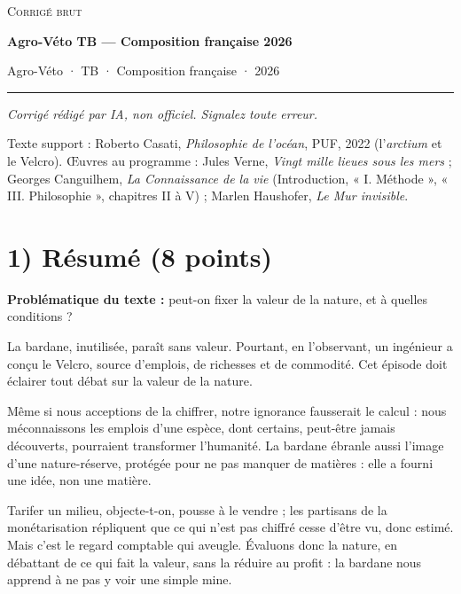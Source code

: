\documentclass[11pt,a4paper]{article}
\begin{document}
\thispagestyle{plain}
\begin{center}
  {\small\scshape Corrigé brut}\par\smallskip
  {\LARGE\bfseries Agro-Véto TB — Composition française 2026\par}\medskip
  {\large Agro-Véto · TB · Composition française · 2026\par}
\end{center}
\vspace{2pt}\hrule\vspace{8pt}

\emph{Corrigé rédigé par IA, non officiel. Signalez toute erreur.}

Texte support : Roberto Casati, \emph{Philosophie de l'océan}, PUF, 2022 (l'\emph{arctium} et le Velcro). Œuvres au programme : Jules Verne, \emph{Vingt mille lieues sous les mers} ; Georges Canguilhem, \emph{La Connaissance de la vie} (Introduction, « I. Méthode », « III. Philosophie », chapitres II à V) ; Marlen Haushofer, \emph{Le Mur invisible}.

\hypertarget{ruxe9sumuxe9-8-points}{%
\section{1) Résumé (8 points)}\label{ruxe9sumuxe9-8-points}}

\textbf{Problématique du texte :} peut-on fixer la valeur de la nature, et à quelles conditions ?

La bardane, inutilisée, paraît sans valeur. Pourtant, en l'observant, un ingénieur a conçu le Velcro, source d'emplois, de richesses et de commodité. Cet \textbar{} épisode doit éclairer tout débat sur la valeur de la nature.

Même si nous acceptions de la chiffrer, notre ignorance fausserait le calcul : nous méconnaissons \textbar{} les emplois d'une espèce, dont certains, peut-être jamais découverts, pourraient transformer l'humanité. La bardane ébranle aussi l'image d'une nature-réserve, \textbar{} protégée pour ne pas manquer de matières : elle a fourni une idée, non une matière.

Tarifer un milieu, objecte-t-on, pousse à le vendre ; \textbar{} les partisans de la monétarisation répliquent que ce qui n'est pas chiffré cesse d'être vu, donc estimé. Mais c'est le regard comptable \textbar{} qui aveugle. Évaluons donc la nature, en débattant de ce qui fait la valeur, sans la réduire au profit : la bardane nous apprend à ne \textbar{} pas y voir une simple mine.
\end{document}
